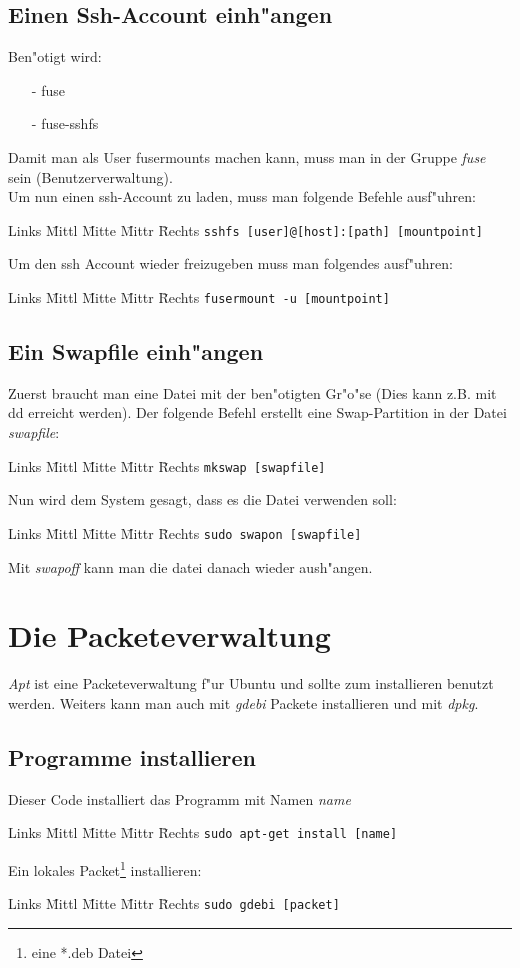 \documentclass[12pt]{article}
\newenvironment{code}{\begin{tabbing}Links \= Mittl \= Mitte \= Mittr \= Rechts \kill}{\end{tabbing}}
\begin{document}
\subsection{Einen Ssh-Account einh"angen}
Ben"otigt wird:
\begin{itemize}
	\item[-] fuse
	\item[-] fuse-sshfs
\end{itemize}
Damit man als User fusermounts machen kann, muss man in der Gruppe \textit{fuse} 
sein (Benutzerverwaltung).\\
Um nun einen ssh-Account zu laden, muss man folgende Befehle ausf"uhren:
\begin{code}
	\> \verb#sshfs [user]@[host]:[path] [mountpoint]#
\end{code}
Um den ssh Account wieder freizugeben muss man folgendes ausf"uhren:
\begin{code}
	\> \verb#fusermount -u [mountpoint]#
\end{code}
\subsection{Ein Swapfile einh"angen}
Zuerst braucht man eine Datei mit der ben"otigten Gr"o"se (Dies kann z.B. mit dd erreicht werden).
Der folgende Befehl erstellt eine Swap-Partition in der Datei \textit{swapfile}:
\begin{code}
	\> \verb#mkswap [swapfile]#
\end{code}
Nun wird dem System gesagt, dass es die Datei verwenden soll:
\begin{code}
	\> \verb#sudo swapon [swapfile]#
\end{code}
Mit \textit{swapoff} kann man die datei danach wieder aush"angen.

\section{Die Packeteverwaltung}
\textit{Apt} ist eine Packeteverwaltung f"ur Ubuntu und sollte zum installieren benutzt werden.
Weiters kann man auch mit \textit{gdebi} Packete installieren und mit \textit{dpkg}.
\subsection{Programme installieren}
Dieser Code installiert das Programm mit Namen \textit{name}
\begin{code}
	\> \verb#sudo apt-get install [name]#
\end{code}
Ein lokales Packet\footnote{eine *.deb Datei} installieren:
\begin{code}
	\> \verb#sudo gdebi [packet]#
\end{code}
\end{document}
